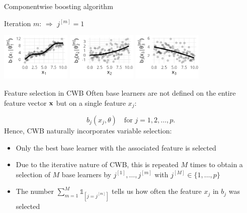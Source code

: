 \documentclass[11pt,compress,t,notes=noshow, xcolor=table]{beamer}
\begin{document}
\begin{vbframe}{Componentwise boosting algorithm}



{\footnotesize Iteration $m$: $\Rightarrow$ $j^{[m]} = 1$}
\begin{center}
\includegraphics[width=0.25\textwidth]{figure/boosting-cwb-bl1-points.png}
\hspace*{0.5cm}
\includegraphics[width=0.25\textwidth]{figure/boosting-cwb-bl2-points.png} 
\hspace*{0.5cm}
\includegraphics[width=0.25\textwidth]{figure/boosting-cwb-bl3-points.png}
\end{center}
\addtocounter{framenumber}{-1}
\end{vbframe}

\begin{vbframe}{Feature selection in CWB}
Often base learners are not defined on the entire feature vector $\mathbf{x}$ but on
a single feature $x_j$:

$$
  b_j(x_j, \theta) \quad \text{for } j = 1, 2, \dots, p.
$$
Hence, CWB naturally incorporates variable selection:
\begin{itemize}
    \item Only the best base learner with the associated feature is selected
    \item Due to the iterative nature of CWB, this is repeated $M$ times to obtain a selection of $M$ base learners by $j^{[1]}, \dots, j^{[m]}$ with $j^{[M]}\in\{1, \dots, p\}$
    \item The number $\sum_{m=1}^M \mathds{1}_{[j = j^{[m]}]}$ tells us how often the feature $x_j$ in $b_j$ was selected
\end{itemize}
\end{vbframe}


\endlecture
\end{document}
